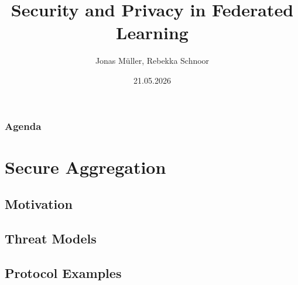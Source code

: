 \documentclass[t,aspectratio=169]{beamer}
\title{Security and Privacy in Federated Learning}
\author[]{Jonas Müller, Rebekka Schnoor}
\date{21.05.2026} %
\begin{document}
\begin{frame}
	\maketitle
\end{frame}

\begin{frame}
	\frametitle{Agenda}
	\tableofcontents
\end{frame}

\section{Secure Aggregation}
\subsection{Motivation}
\subsection{Threat Models}
\subsection{Protocol Examples}
\end{document}
